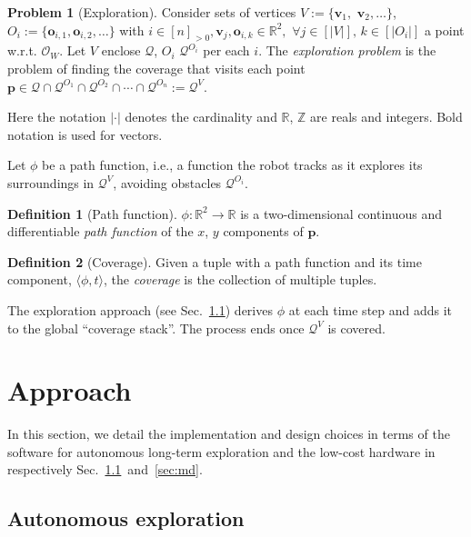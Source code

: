 \documentclass[lettersize,journal,twoside]{IEEEtran}
\theoremstyle{definition}
\newtheorem{defn}{Definition}[section]
\newtheorem*{pb}{Problem}%
\begin{document}
\begin{pb}[Exploration]
  Consider sets of vertices $V:=\{\mathbf{v}_1,$ $\mathbf{v}_2,\dots\}$, $O_i:=\{\mathbf{o}_{i,1},\mathbf{o}_{i,2},\dots\}$ with $i\in[n]_{>0},\mathbf{v}_j,\mathbf{o}_{i,k}\in\mathbb{R}^2,$ $\forall j\in[|V|],\,k\in[|O_i|]$ a point w.r.t. $\mathcal{O}_W$. Let $V$ enclose $\mathcal{Q}$, $O_i$ $\mathcal{Q}^{O_i}$ per each $i$. The \textit{exploration problem} is the problem of finding the coverage that visits each point $\mathbf{p}\in\mathcal{Q}\cap\mathcal{Q}^{O_1}\cap\mathcal{Q}^{O_2}\cap\cdots\cap\mathcal{Q}^{O_n}:=\mathcal{Q}^V$.
\end{pb}

Here the notation $|\cdot|$ denotes the cardinality and $\mathbb{R}$, $\mathbb{Z}$ are reals and integers. Bold notation is used for vectors.

Let $\phi$ be a path function, i.e., a function the robot tracks as it explores its surroundings in $\mathcal{Q}^V$, avoiding %
obstacles $\mathcal{Q}^{O_i}$.

\begin{defn}[Path function]\label{def:pf}
  $\phi:\mathbb{R}^2\rightarrow\mathbb{R}$ is a two-dimensional continuous and differentiable \textit{path function} of the $x$, $y$ components of $\mathbf{p}$.
\end{defn}

\begin{defn}[Coverage]\label{def:co}
  Given a tuple with a path function and its time component, $\langle\phi,t\rangle$, the \textit{coverage} is the collection of multiple tuples.
\end{defn}

The %
exploration approach %
(see Sec.~\ref{sec:le}) derives $\phi$ at each time step and adds it to the global ``coverage stack''. The process ends once $\mathcal{Q}^V$ is covered.


\section{Approach}
\label{sec:m}
\noindent
In this section, we detail the implementation and design choices in terms of %
the software for autonomous long-term %
exploration and the low-cost hardware in respectively Sec.~\ref{sec:le}~and~\ref{sec:md}.

\subsection{Autonomous %
exploration}
\label{sec:le}
\end{document}
